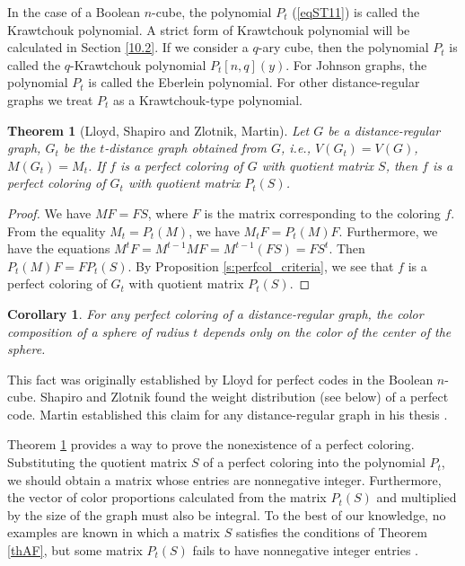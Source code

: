 \documentclass[11pt]{article}
\newtheorem{theorem}{Theorem}[section]
\newtheorem{corollary}{Corollary}[section]
\theoremstyle{definition}
\newtheorem{remark}{Remark}[section]
\begin{document}
In the case of a Boolean $n$-cube, the polynomial $P_{t}$ (\ref{eqST11}) is called 
the  Krawtchouk polynomial.  A strict form of   Krawtchouk polynomial will be calculated in Section  \ref{10.2}. 
 If we consider a $q$-ary
cube, then the polynomial $P_{t}$ is called the $q$-Krawtchouk polynomial
$P_{t}[n,q](y)$. For Johnson graphs,
the polynomial $P_{t}$ is called the Eberlein polynomial.  For other distance-regular graphs we treat $P_t$ as  a
Krawtchouk-type polynomial.




\begin{theorem}[Lloyd, Shapiro and Zlotnik, Martin]\label{th:shapiro_zlotnik_martin}
Let $G$ be a distance-regular graph, $G_t$ be the $t$-distance graph obtained from $G$, i.e., $V(G_t)=V(G)$,
$M(G_t)=M_t$. If $f$ is a perfect coloring of $G$ with
quotient matrix $S$, then $f$ is a perfect coloring of $G_t$ with quotient matrix $P_t(S)$.
\end{theorem}
\begin{proof}
We have $MF=FS$, where $F$ is the matrix corresponding to the coloring $f$.
From the equality $M_t=P_t(M)$, we have $M_t F=P_t(M) F$.
Furthermore, we have the equations $M^t F=M^{t-1}MF=M^{t-1}(FS)=FS^t$. Then
$P_t(M) F=FP_t(S)$. By Proposition \ref{s:perfcol_criteria},  we see that $f$ is a perfect coloring of $G_t$ with quotient matrix $P_t(S)$.
\end{proof}

\begin{corollary}\label{c:szm_spherecoloring}
For any perfect coloring of a distance-regular graph,
the color composition of a sphere of radius $t$ depends only on the color of the center
of the sphere. \end{corollary}

This fact was originally established by Lloyd \cite{Lloyd} for
perfect codes in the Boolean $n$-cube. Shapiro and Zlotnik
\cite{Shapiro} found the weight distribution (see below) of a perfect
code. Martin established  this claim for any  distance-regular graph in his  thesis \cite{Martin}.


Theorem \ref{th:shapiro_zlotnik_martin} provides a way to prove
the nonexistence of a perfect coloring. Substituting the quotient matrix $S$
of a perfect coloring into the polynomial $P_t$, we should obtain a matrix
whose entries are  nonnegative integer. Furthermore, the vector
of color proportions calculated from the matrix $P_t(S)$ and multiplied by the size
of the  graph must also be integral.
To the best of our knowledge, no examples are known in which a matrix $S$ satisfies the conditions
of Theorem \ref{thAF}, but  some matrix $P_t(S)$ fails to have nonnegative integer entries .
\end{document}
